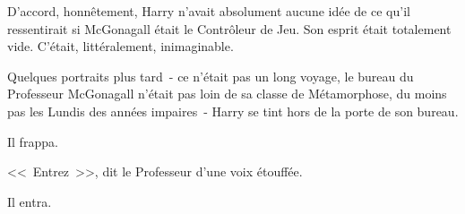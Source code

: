 D'accord, honnêtement, Harry n'avait absolument aucune idée de ce qu'il ressentirait si McGonagall était le Contrôleur de Jeu. Son esprit était totalement vide. C'était, littéralement, inimaginable.

Quelques portraits plus tard~- ce n'était pas un long voyage, le bureau du Professeur McGonagall n'était pas loin de sa classe de Métamorphose, du moins pas les Lundis des années impaires~- Harry se tint hors de la porte de son bureau.

Il frappa.

<<~Entrez~>>, dit le Professeur d'une voix étouffée.

Il entra.

